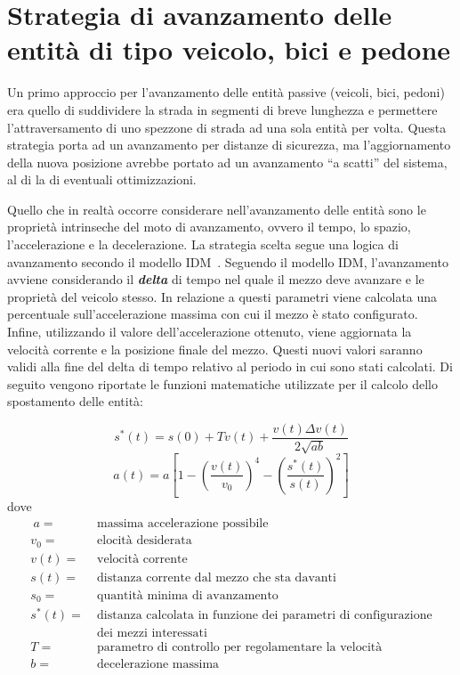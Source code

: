 \section{Strategia di avanzamento delle entità di tipo veicolo, bici e pedone}
Un primo approccio per l'avanzamento delle entità passive (veicoli, bici,
pedoni) era quello di suddividere la strada in segmenti di breve lunghezza e
permettere l'attraversamento di uno spezzone di strada ad una sola entità per
volta.
Questa strategia porta ad un avanzamento per distanze di sicurezza, ma
l'aggiornamento della nuova posizione avrebbe portato ad un avanzamento ``a
scatti'' del sistema, al di la di eventuali ottimizzazioni.

Quello che in realtà occorre considerare nell'avanzamento delle entità sono le
proprietà intrinseche del moto di avanzamento, ovvero il tempo, lo spazio,
l'accelerazione e la decelerazione. La strategia scelta segue una logica di
avanzamento secondo il modello \ac{IDM}~\cite{treiber2000microscopic}.
Seguendo il modello \ac{IDM}, l'avanzamento avviene considerando il
\textbf{\textit{delta}} di tempo nel quale il mezzo deve avanzare e le proprietà
del veicolo stesso. In relazione a questi parametri viene calcolata una
percentuale sull'accelerazione massima con cui il mezzo è stato configurato.
Infine, utilizzando il valore dell'accelerazione ottenuto, viene aggiornata la
velocità corrente e la posizione finale del mezzo.
Questi nuovi valori saranno validi alla fine del delta di tempo relativo al
periodo in cui sono stati calcolati. Di seguito vengono riportate le funzioni
matematiche utilizzate per il calcolo dello spostamento delle entità:

\begin{equation}
s^{*}(t)=s(0)+Tv(t)+\frac{v(t)\Delta{v(t)}}{2\sqrt{ab}}
\end{equation}
\begin{equation}
a(t)=a[1-(\frac{v(t)}{v_{0}})^4-(\frac{s^{*}(t)}{s(t)})^2]
\end{equation}
dove
\begin{align*}
~a =&~\text{massima accelerazione possibile}\\
v_{0} =&~ \text{elocità desiderata} \\
v(t) =&~ \text{velocità corrente} \\
s(t) =&~ \text{distanza corrente dal mezzo che sta davanti} \\
s_{0} =&~ \text{quantità minima di avanzamento} \\
s^*(t) =&~ \text{distanza calcolata in funzione dei parametri di configurazione}
\\ &~ \text{dei mezzi interessati} \\
T =&~ \text{parametro di controllo per regolamentare la velocità} \\
b =&~ \text{decelerazione massima}
\end{align*}

